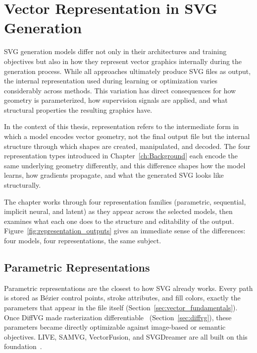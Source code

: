 \chapter{Vector Representation in SVG Generation}
\label{ch:representation}

SVG generation models differ not only in their architectures and 
training objectives but also in how they represent vector graphics 
internally during the generation process. While all approaches 
ultimately produce SVG files as output, the internal representation 
used during learning or optimization varies considerably across 
methods. This variation has direct consequences for how geometry is 
parameterized, how supervision signals are applied, and what 
structural properties the resulting graphics have.

In the context of this thesis, representation refers to the 
intermediate form in which a model encodes vector geometry, not 
the final output file but the internal structure through which 
shapes are created, manipulated, and decoded. The four 
representation types introduced in 
Chapter~\ref{ch:Background} each encode the same underlying 
geometry differently, and this difference shapes how the model 
learns, how gradients propagate, and what the generated SVG 
looks like structurally.

The chapter works through four representation families 
(parametric, sequential, implicit neural, and latent) as 
they appear across the selected models, then examines what 
each one does to the structure and editability of the output. 
Figure~\ref{fig:representation_outputs} gives an immediate 
sense of the differences: four models, four representations, 
the same subject.


\section{Parametric Representations}

Parametric representations are the closest to how SVG already 
works. Every path is stored as B\'{e}zier control points, stroke 
attributes, and fill colors, exactly the parameters that appear 
in the file itself 
(Section~\ref{sec:vector_fundamentals}). Once DiffVG made 
rasterization 
differentiable~\cite{liDifferentiableVectorGraphics2020a} 
(Section~\ref{sec:diffvg}), these parameters became directly 
optimizable against image-based or semantic objectives. LIVE, 
SAMVG, VectorFusion, and SVGDreamer are all built on this 
foundation~\cite{maLayerwiseImageVectorization2022, 
zhuSAMVGMultistageImage2023, 
jainVectorFusionTexttoSVGAbstracting2022, 
xingSVGDreamerTextGuided2024}.

